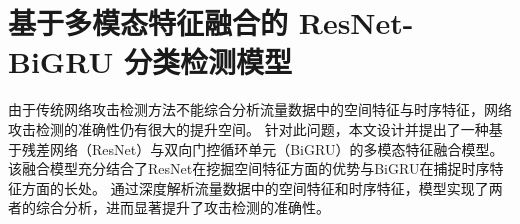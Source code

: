\chapter{基于多模态特征融合的 ResNet-BiGRU 分类检测模型}
\label{cha:ResNet-BiGRU}

由于传统网络攻击检测方法不能综合分析流量数据中的空间特征与时序特征，网络攻击检测的准确性仍有很大的提升空间。
针对此问题，本文设计并提出了一种基于残差网络（ResNet）与双向门控循环单元（BiGRU）的多模态特征融合模型。
该融合模型充分结合了ResNet在挖掘空间特征方面的优势与BiGRU在捕捉时序特征方面的长处。
通过深度解析流量数据中的空间特征和时序特征，模型实现了两者的综合分析，进而显著提升了攻击检测的准确性。


